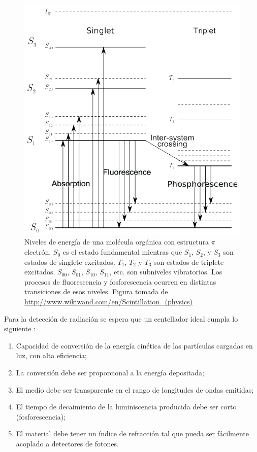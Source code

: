 \documentclass[12pt,oneside,openany,letter]{book}
\begin{document}
\begin{figure}
\begin{center}
\includegraphics[scale=0.5]{scintillation_process.png}
\caption[Niveles de energía de una molécula orgánica con estructura $\pi$ electrón.]{Niveles de energía de una molécula orgánica con estructura $\pi$ electrón. $S_0$ es el estado fundamental mientras que $S_1$, $S_2$, y $S_3$ son estados de singlete excitados. $T_1$, $T_2$ y $T_3$ son estados de triplete excitados. $S_{00}$, $S_{01}$, $S_{10}$, $S_{11}$, etc. son subniveles vibratorios. Los procesos de fluorescencia y fosforescencia ocurren en distintas transiciones de esos niveles. Figura tomada de \url{ http://www.wikiwand.com/en/Scintillation_(physics)}}
\label{scintillation_process}
\end{center}
\end{figure}

Para la detección de radiación se espera que un centellador ideal cumpla lo siguiente \cite{Gonzalez-maestrando2012}:
\begin{enumerate}
\item Capacidad de conversión de la energía cinética de las partículas cargadas en luz, con alta eficiencia;
\item La conversión debe ser proporcional a la energía depositada;
\item El medio debe ser transparente en el rango de longitudes de ondas emitidas;
\item El tiempo de decaimiento de la luminiscencia producida debe ser corto (fosforescencia);
\item El material debe tener un índice de refracción tal que pueda ser fácilmente acoplado a detectores de fotones.
\end{enumerate}
\end{document}
